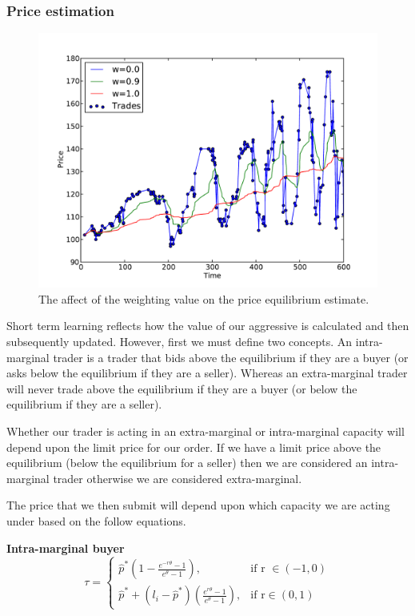 \documentclass[preprint]{acm_proc_article-sp} %
\begin{document}
\subsubsection{Price estimation} \label{sec:AA_price_estimation}
\begin{figure}
  \centering
  \label{fig:equilibrium}
  \includegraphics[width=\columnwidth]{graphs_and_stats/equilibriums.pdf}
  \caption{The affect of the weighting value on the price equilibrium
  estimate.}
\end{figure}

Short term learning reflects how the value of our aggressive is calculated and
then subsequently updated. However, first we must define two concepts. An
intra-marginal trader is a trader that bids above the equilibrium if they are a
buyer (or asks below the equilibrium if they are a seller). Whereas an
extra-marginal trader will never trade above the equilibrium if they are a
buyer (or below the equilibrium if they are a seller).

Whether our trader is acting in an extra-marginal or intra-marginal capacity
will depend upon the limit price for our order. If we have a limit price above
the equilibrium (below the equilibrium for a seller) then we are considered an
intra-marginal trader otherwise we are considered extra-marginal.

The price that we then submit will depend upon which capacity we are acting
under based on the follow equations.

\textbf{Intra-marginal buyer}
\begin{equation}
    \label{eqn:intrabuyer}
    \tau =
    \begin{cases}
        \hat{p}^*(1- \frac{e^{-r\theta}-1}{e^{\theta}-1}), &  \text{if r } \in (-1,0)  \\
        \hat{p}^* + (l_i-\hat{p}^*)(\frac{e^{r\theta}-1}{e^\theta-1}), & \text{if r} \in (0,1)
    \end{cases}
\end{equation}
\end{document}
